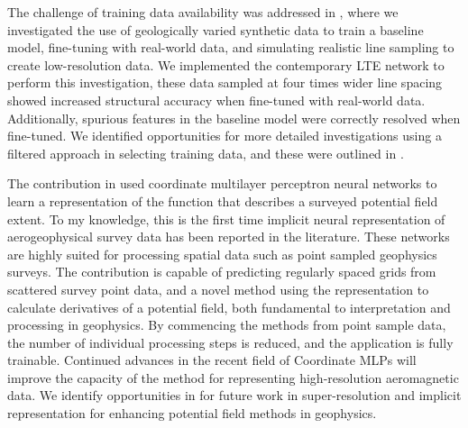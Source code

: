 The challenge of training data availability was addressed in , where we investigated the use of geologically varied synthetic data to train a baseline model, fine-tuning with real-world data, and simulating realistic line sampling to create low-resolution data.
We implemented the contemporary LTE network to perform this investigation, these data sampled at four times wider line spacing showed increased structural accuracy when fine-tuned with real-world data.
Additionally, spurious features in the baseline model were correctly resolved when fine-tuned.
We identified opportunities for more detailed investigations using a filtered approach in selecting training data, and these were outlined in .

The contribution in  used coordinate multilayer perceptron neural networks to learn a representation of the function that describes a surveyed potential field extent.
To my knowledge, this is the first time implicit neural representation of aerogeophysical survey data has been reported in the literature.
These networks are highly suited for processing spatial data such as point sampled geophysics surveys.
The contribution is capable of predicting regularly spaced grids from scattered survey point data, and a novel method using the representation to calculate derivatives of a potential field, both fundamental to interpretation and processing in geophysics.
By commencing the methods from point sample data, the number of individual processing steps is reduced, and the application is fully trainable.
Continued advances in the recent field of Coordinate MLPs will improve the capacity of the method for representing high-resolution aeromagnetic data. 
We identify opportunities in  for future work in super-resolution and implicit representation for enhancing potential field methods in geophysics.

% 